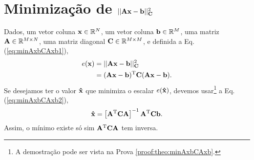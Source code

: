 \section{Minimização de $||\MATRIX{A}\VECTOR{x}-\VECTOR{b}||_{\MATRIX{C}}^2$
}

\begin{theorem}\label{theo:minAxbCAxb}
Dados,
um vetor coluna $\VECTOR{x}\in \mathbb{R}^N$, 
um vetor coluna $\VECTOR{b}\in \mathbb{R}^M$,  
uma matriz $\MATRIX{A} \in \mathbb{R}^{M\times N}$, 
uma matriz diagonal $\MATRIX{C} \in \mathbb{R}^{M\times M}$, e 
definida a Eq. (\ref{eq:minAxbCAxb1}),
\begin{align}\label{eq:minAxbCAxb1}
e(\VECTOR{x}) & = ||\MATRIX{A}\VECTOR{x}-\VECTOR{b}||_{\MATRIX{C}}^2 \\
              & = (\MATRIX{A}\VECTOR{x}-\VECTOR{b})^{\transpose}\MATRIX{C}(\MATRIX{A}\VECTOR{x}-\VECTOR{b}).
\end{align}
Se desejamos ter o valor $\VECTOR{\hat{x}}$ que minimiza o escalar $e(\VECTOR{\hat{x}})$,
devemos usar\footnote{A demostração pode ser vista na Prova \ref{proof:theo:minAxbCAxb}.} a Eq. (\ref{eq:minAxbCAxb2}),
\begin{equation}\label{eq:minAxbCAxb2}
\VECTOR{\hat{x}} =
\left[ \MATRIX{A}^{\transpose}\MATRIX{C} \MATRIX{A} \right]^{-1}\MATRIX{A}^{\transpose}\MATRIX{C}\VECTOR{b}.
\end{equation}
Assim, o mínimo existe só sim $\MATRIX{A}^{\transpose}\MATRIX{C} \MATRIX{A}$ tem inversa.
\end{theorem}


